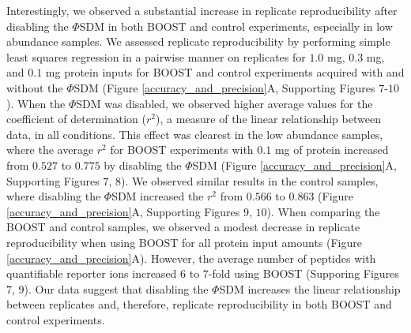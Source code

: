 \documentclass[journal=jprobs,manuscript=article]{achemso}
\begin{document}
Interestingly, we observed a substantial increase in replicate reproducibility after disabling the $\Phi$SDM in both BOOST and control experiments, especially in low abundance samples. We assessed replicate reproducibility by performing simple least squares regression in a pairwise manner on replicates for $1.0$ mg, $0.3$ mg, and $0.1$ mg protein inputs for BOOST and control experiments acquired with and without the $\Phi$SDM (Figure \ref{accuracy_and_precision}A, Supporting Figures $7$-$10$). When the $\Phi$SDM was disabled, we observed higher average values for the coefficient of determination ($r^{2}$), a measure of the linear relationship between data, in all conditions. This effect was clearest in the low abundance samples, where the average $r^{2}$ for BOOST experiments with $0.1$ mg of protein increased from $0.527$ to $0.775$ by disabling the $\Phi$SDM (Figure \ref{accuracy_and_precision}A, Supporting Figures $7$, $8$). We observed similar results in the control samples, where disabling the $\Phi$SDM increased the $r^{2}$ from $0.566$ to $0.863$ (Figure \ref{accuracy_and_precision}A, Supporting Figures $9$, $10$). When comparing the BOOST and control samples, we observed a modest decrease in replicate reproducibility when using BOOST for all protein input amounts (Figure \ref{accuracy_and_precision}A). However, the average number of peptides with quantifiable reporter ions increased $6$ to $7$-fold using BOOST (Supporing Figures $7$, $9$). Our data suggest that disabling the $\Phi$SDM increases the linear relationship between replicates and, therefore, replicate reproducibility in both BOOST and control experiments.
\end{document}
